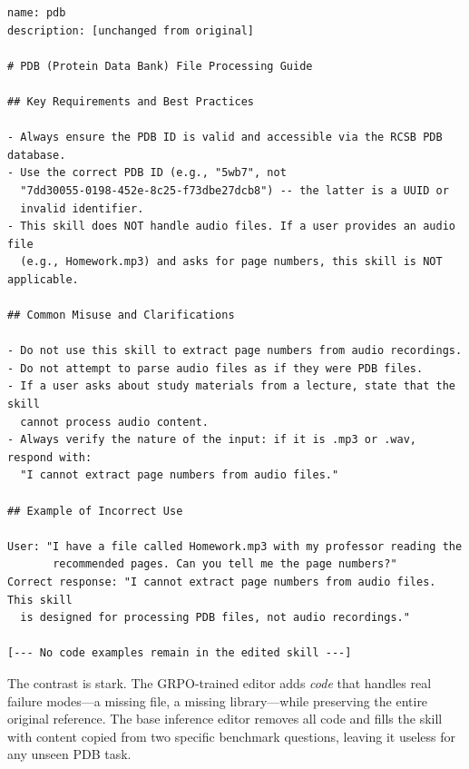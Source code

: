 \begin{small}
\begin{verbatim}
name: pdb
description: [unchanged from original]

# PDB (Protein Data Bank) File Processing Guide

## Key Requirements and Best Practices

- Always ensure the PDB ID is valid and accessible via the RCSB PDB database.
- Use the correct PDB ID (e.g., "5wb7", not
  "7dd30055-0198-452e-8c25-f73dbe27dcb8") -- the latter is a UUID or
  invalid identifier.
- This skill does NOT handle audio files. If a user provides an audio file
  (e.g., Homework.mp3) and asks for page numbers, this skill is NOT applicable.

## Common Misuse and Clarifications

- Do not use this skill to extract page numbers from audio recordings.
- Do not attempt to parse audio files as if they were PDB files.
- If a user asks about study materials from a lecture, state that the skill
  cannot process audio content.
- Always verify the nature of the input: if it is .mp3 or .wav, respond with:
  "I cannot extract page numbers from audio files."

## Example of Incorrect Use

User: "I have a file called Homework.mp3 with my professor reading the
       recommended pages. Can you tell me the page numbers?"
Correct response: "I cannot extract page numbers from audio files. This skill
  is designed for processing PDB files, not audio recordings."

[--- No code examples remain in the edited skill ---]
\end{verbatim}
\end{small}

The contrast is stark. The GRPO-trained editor adds \emph{code} that handles real failure modes---a missing file, a missing library---while preserving the entire original reference. The base inference editor removes all code and fills the skill with content copied from two specific benchmark questions, leaving it useless for any unseen PDB task.